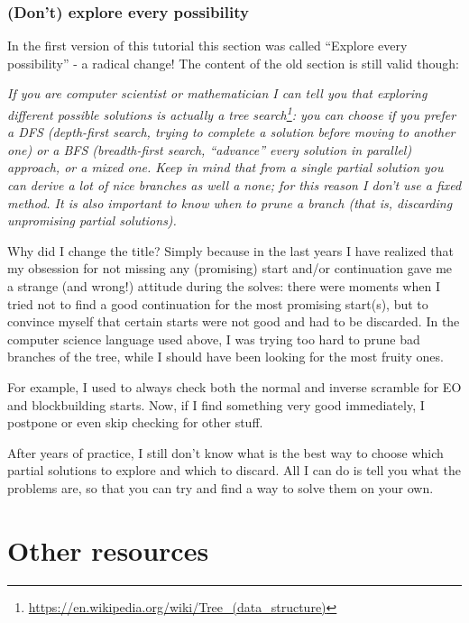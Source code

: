 \documentclass[11pt,a4paper]{book}
\begin{document}
\subsection{(Don't) explore every possibility}

In the first version of this tutorial this section was called ``Explore every possibility'' - a radical change! The content of the old section is still valid though:

\bigskip
\emph{If you are computer scientist or mathematician I can tell you that exploring different possible solutions is actually a tree search\footnote{\url{https://en.wikipedia.org/wiki/Tree_(data_structure)}}: you can choose if you prefer a DFS (depth-first search, trying to complete a solution before moving to another one) or a BFS (breadth-first search, “advance” every solution in parallel) approach, or a mixed one. Keep in mind that from a single partial solution you can derive a lot of nice branches as well a none; for this reason I don't use a fixed method. It is also important to know when to prune a branch (that is, discarding unpromising partial solutions).}

\bigskip
Why did I change the title? Simply because in the last years I have realized that my obsession for not missing any (promising) start and/or continuation gave me a strange (and wrong!) attitude during the solves: there were moments when I tried not to find a good continuation for the most promising start(s), but to convince myself that certain starts were not good and had to be discarded. In the computer science language used above, I was trying too hard to prune bad branches of the tree, while I should have been looking for the most fruity ones.

For example, I used to always check both the normal and inverse scramble for EO and blockbuilding starts. Now, if I find something very good immediately, I postpone or even skip checking for other stuff.

After years of practice, I still don't know what is the best way to choose which partial solutions to explore and which to discard. All I can do is tell you what the problems are, so that you can try and find a way to solve them on your own.

\appendix

\chapter{Other resources}
\label{other_sources}
\end{document}
